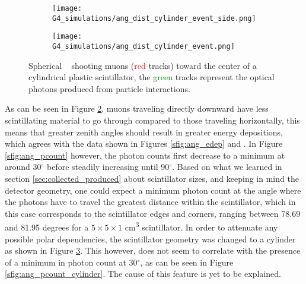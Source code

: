 \begin{figure}[H]
  \centering
  \begin{subfigure}[t]{0.48\textwidth}
    \texttt{[image: G4\_simulations/ang\_dist\_cylinder\_event\_side.png]}
    \caption{\label{sfig:ang_dist_cyl}}
  \end{subfigure}
  \hfill
  \begin{subfigure}[t]{0.48\textwidth}
    \texttt{[image: G4\_simulations/ang\_dist\_cylinder\_event.png]}
    \caption{\label{sfig:ang_dist_cyl_side}}
  \end{subfigure}
  \caption{\label{fig:ang_dist_cyl_event}Spherical \gps~ shooting muons (\textcolor{red}{red} tracks) toward the center of a cylindrical plastic scintillator, the \textcolor{green}{green} tracks represent the optical photons produced from particle interactions.}
\end{figure}

As can be seen in Figure \ref{sfig:ang_dist_cyl_side}, muons traveling directly downward have less scintillating material to go through compared to those traveling horizontally, this means that greater zenith angles should result in greater energy depositions, which agrees with the data shown in Figures \ref{sfig:ang_edep} and . In Figure \ref{sfig:ang_pcount} however, the photon counts first decrease to a minimum at around 30$^\circ$ before steadily increasing until 90$^\circ$. Based on what we learned in section \ref{sec:collected_produced} about scintillator sizes, and keeping in mind the detector geometry, one could expect a minimum photon count at the angle where the photons have to travel the greatest distance within the scintillator, which in this case corresponds to the scintillator edges and corners, ranging between 78.69 and 81.95 degrees for a $5\times5\times1$ \unit{\cm\cubed} scintillator. In order to attenuate any possible polar dependencies, the scintillator geometry was changed to a cylinder as shown in Figure \ref{fig:ang_dist_cyl_event}. This however, does not seem to correlate with the presence of a minimum in photon count at 30$^\circ$, as can be seen in Figure \ref{sfig:ang_pcount_cylinder}. The cause of this feature is yet to be explained.


